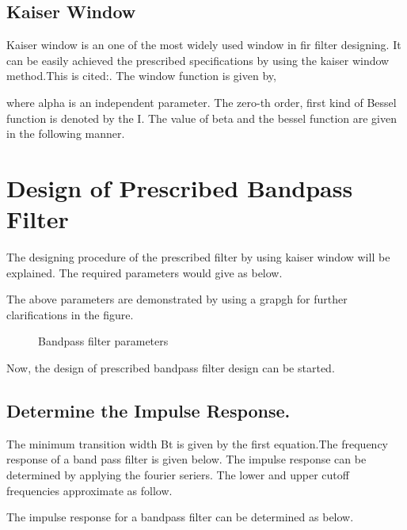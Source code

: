 \documentclass[twoside,12pt,times,onecolumn,a4paper]{report}
\begin{document}
\subsection{Kaiser Window}
\hspace{4em}Kaiser window is an one of the most widely used window in fir filter designing. It can be easily achieved the prescribed specifications by using the kaiser window method.This is cited:\cite{ukessay}. The window function is given by,


where alpha is an independent parameter. The zero-th order, first kind of  Bessel function is denoted by the I. The value of beta and the bessel function are given in the following manner.


\section{Design of Prescribed Bandpass Filter}

\hspace{4em}The designing procedure of the prescribed filter by using kaiser window will be explained. The required parameters would give as below.


The above parameters are demonstrated by using a grapgh for further clarifications in the figure. 
 
\begin{figure}[!h]
  \centering
  \caption{Bandpass filter parameters}
\end{figure}



Now, the design of prescribed bandpass filter design can be started.

\subsection{Determine the Impulse Response.}

\hspace{4em}The minimum transition width Bt is given by the first equation.The frequency response of a band pass filter is given below. The impulse response can be determined by applying the fourier seriers. The lower and upper cutoff frequencies approximate as follow.


The impulse response for a bandpass filter can be determined as below.
\end{document}
